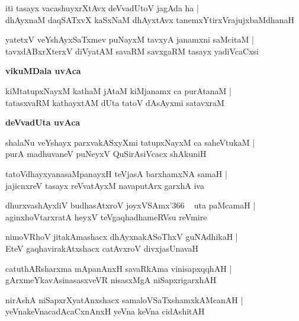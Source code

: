 \documentclass[twoside,12pt,openright]{book}
\newcounter{shloka}[chapter]
\def\uvaca#1{\centerline{{\large\textbf{#1}}}}
\begin{document}
\begin{shloka}
iti tasayx vacashuyxrXtAvx deVvadUtoV jagAda ha |\\
dhAyxnaM daqSATxvX kaSxNaM dhAyxtAvx tanemxYtirxVrajujxbaMdhanaH 
\end{shloka}

\begin{shloka}
yatetxV veYshAyxSaTxmev puNayxM tavxyA janamxni saMcitaM |\\
tavxdABxrXterxV diVyatAM savaRM savxgaRM tasayx yadiVcaCxsi 
\end{shloka}

\uvaca{ vikuMDala uvAca }

\begin{shloka}
kiMtatupxNayxM kathaM jAtaM kiMjanamx ca purAtanaM |\\
tatasxvaRM kathayxtAM dUta tatoV dAsAyxmi satavxraM 
\end{shloka}

\uvaca{deVvadUta uvAca }

\begin{shloka}
shalaNu veYshayx parxvakASxyXmi tatupxNayxM ca saheVtukaM |\\
purA madhuvaneV puNeyxV QuSirAsiVcacx shAkuniH 
\end{shloka}

\begin{shloka}
tatoVdhayxyanasaMpanayxH teVjasA barxhamxNA samaH |\\
jajicnxreV tasayx reVvatAyxM navaputArx garxhA iva
\end{shloka}

\begin{shloka}
dhurxvashAyxliV budhasAtxroV joyxVSAmx\char'366 ~ uta paMcamaH |\\
aginxhoVtarxratA heyxV teVgaqhadhameRVsu reVmire
\end{shloka}

\begin{shloka}
nimoVRhoV jitakAmashacx dhAyxnakASoThxV guNAdhikaH |\\
EteV gaqhavirakAtxshacx catAvxroV divxjasUnavaH 
\end{shloka}

\begin{shloka}
catuthARsharxma mApanAnxH savaRkAma vinisapxqqhAH |\\
gArxmeYkavAsinasasxveVR nisasxMgA niSapxrigarxhAH 
\end{shloka}

\begin{shloka}
nirAshA niSapxrXyatAnxshacx samaloVSaTxshamxkAMcanAH |\\
yeVnakeVnacadAcaCxnAnxH yeVna keVna cidAshitAH 
\end{shloka}
\end{document}
